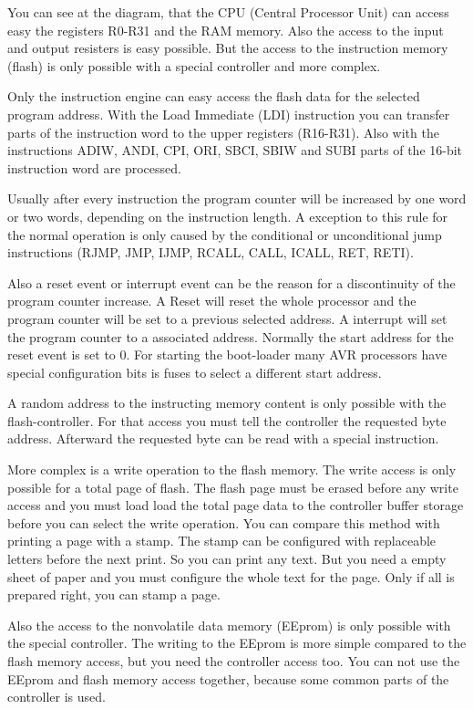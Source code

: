 You can see at the diagram, that the CPU (Central Processor Unit) can
access easy the registers R0-R31 and the RAM memory.
Also the access to the input and output resisters is easy possible.
But the access to the instruction memory (flash) is only possible
with a special controller and more complex.

Only the instruction engine can easy access the flash data for
the selected program address.
With the Load Immediate (LDI) instruction you can transfer parts of 
the instruction word to the upper registers (R16-R31).
Also with the instructions ADIW, ANDI, CPI, ORI, SBCI, SBIW and SUBI 
parts of the 16-bit instruction word are processed.

Usually after every instruction the program counter will be
increased by one word or two words, depending on the instruction length.
A exception to this rule for the normal operation is only
caused by the conditional or unconditional jump instructions
(RJMP, JMP, IJMP, RCALL, CALL, ICALL, RET, RETI).

Also a reset event or interrupt event can be the reason for
a discontinuity of the program counter increase.
A Reset will reset the whole processor and the program counter
will be set to a previous selected address.
A interrupt will set the program counter to a associated address.
Normally the start address for the reset event is set to 0.
For starting the boot-loader many AVR processors have special
configuration bits is fuses to select a different start address.

A random address to the instructing memory content is only possible
with the flash-controller.
For that access you must tell the controller the requested  byte address.
Afterward the requested byte can be read with a special instruction.

More complex is a write operation to the flash memory.
The write access is only possible for a total page of flash.
The flash page must be erased before any write access and
you must load load the total page data to the controller buffer storage
before you can select the write operation.
You can compare this method with printing a page with a stamp.
The stamp can be configured with replaceable letters before the next print.
So you can print any text.
But you need a empty sheet of paper and you must configure the whole
text for the page.
Only if all is prepared right, you can stamp a page.

Also the access to the nonvolatile data memory (EEprom) is only possible
with the special controller. The writing to the EEprom is more
simple compared to the flash memory access, but you need the
controller access too.
You can not use the EEprom and flash memory access together,
because some common parts of the controller is used.

